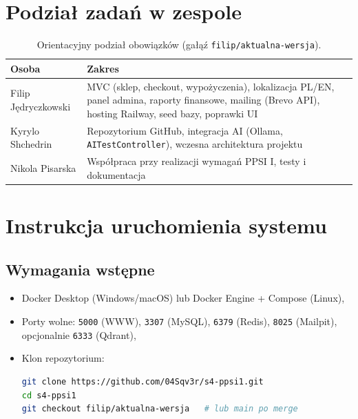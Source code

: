 \documentclass[12pt,a4paper]{article}
\begin{document}
\section{Podział zadań w zespole}

\begin{table}[H]
\centering
\caption{Orientacyjny podział obowiązków (gałąź \texttt{filip/aktualna-wersja}).}
\begin{tabular}{@{}lp{}@{}}
\toprule
\textbf{Osoba} & \textbf{Zakres} \\
\midrule
Filip Jędryczkowski &
    MVC (sklep, checkout, wypożyczenia), lokalizacja PL/EN, panel admina,
    raporty finansowe, mailing (Brevo API), hosting Railway, seed bazy, poprawki UI \\
Kyrylo Shchedrin &
    Repozytorium GitHub, integracja AI (Ollama, \texttt{AITestController}),
    wczesna architektura projektu \\
Nikola Pisarska &
    Współpraca przy realizacji wymagań PPSI I, testy i dokumentacja \\
\bottomrule
\end{tabular}
\end{table}

\section{Instrukcja uruchomienia systemu}

\subsection{Wymagania wstępne}

\begin{itemize}
    \item Docker Desktop (Windows/macOS) lub Docker Engine + Compose (Linux),
    \item Porty wolne: \texttt{5000} (WWW), \texttt{3307} (MySQL), \texttt{6379} (Redis),
          \texttt{8025} (Mailpit), opcjonalnie \texttt{6333} (Qdrant),
    \item Klon repozytorium:
\begin{lstlisting}[language=bash]
git clone https://github.com/04Sqv3r/s4-ppsi1.git
cd s4-ppsi1
git checkout filip/aktualna-wersja   # lub main po merge
\end{lstlisting}
\end{itemize}
\end{document}
